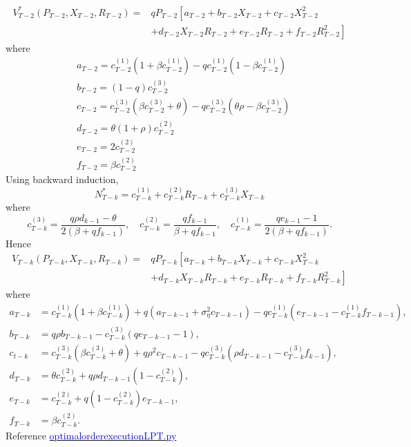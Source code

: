 \documentclass{article}
\begin{document}
$$
\begin{aligned}
V_{T-2}^{*}\left({P}_{T-2}, X_{T-2}, R_{T-2}\right)=& q {P}_{T-2}\left[a_{T-2}+b_{T-2} X_{T-2}+c_{T-2} X_{T-2}^{2}\right.\\
&\left.+d_{T-2} X_{T-2} R_{T-2}+e_{
T-2} R_{T-2}+f_{T-2} R_{T-2}^{2}\right]
\end{aligned}
$$
where
$$
\begin{aligned}
&a_{T-2}=c^{(1)}_{T-2}\left(1+\beta c^{(1)}_{T-2}\right)-q c^{(1)}_{T-2}\left(1-\beta c^{(1)}_{T-2}\right) \\
&b_{T-2}=(1-q) c^{(3)}_{T-2} \\
&c_{T-2}=c^{(3)}_{T-2}\left(\beta c^{(3)}_{T-2}+\theta\right)-q c^{(3)}_{T-2}\left(\theta \rho-\beta c^{(3)}_{T-2}\right) \\
&d_{T-2}=\theta(1+\rho) c^{(2)}_{T-2}\\
&e_{T-2}=2 c^{(2)}_{T-2} \\
&f_{T-2}=\beta c^{(2)}_{T-2}
\end{aligned}
$$
Using backward induction, 
$$
N_{T-k}^{*}=c^{(1)}_{T-k} +c^{(2)}_{T-k} R_{T-k}+c^{(3)}_{T-k} X_{T-k}
$$
where
$$
c^{(3)}_{T-k}=\frac{q \rho d_{k-1}-\theta}{2\left(\beta+q f_{k-1}\right)}, \quad c^{(2)}_{T-k}=\frac{q f_{k-1}}{\beta+q f_{k-1}}, \quad c^{(1)}_{T-k}=\frac{q e_{k-1}-1}{2\left(\beta+q f_{k-1}\right)} .
$$
Hence
$$
\begin{aligned}
V_{T-k}\left({P}_{T-k}, X_{T-k}, R_{T-k}\right)=& q {P}_{T-k}\left[a_{T-k}+b_{T-k} X_{T-k}+c_{T-k} X_{T-k}^{2}\right.\\
&\left.+d_{T-k} X_{T-k} R_{T-k}+e_{T-k} R_{T-k}+f_{T-k} R_{T-k}^{2}\right]
\end{aligned}
$$
where
$$
\begin{array}{ll}
a_{T-k} & =c^{(1)}_{T-k}\left(1+\beta c^{(1)}_{T-k}\right)+q\left(a_{T-k-1}+\sigma_{\eta}^{2} c_{T-k-1}\right)-q c^{(1)}_{T-k}\left(e_{T-k-1}-c^{(1)}_{T-k} f_{T-k-1}\right), \\
b_{T-k} & =q \rho b_{T-k-1}-c^{(3)}_{T-k}\left(q e_{T-k-1}-1\right), \\
c_{t-k} & =c^{(3)}_{T-k}\left(\beta c^{(3)}_{T-k}+\theta\right)+q \rho^{2} c_{T-k-1}-q c^{(3)}_{T-k}\left(\rho d_{T-k-1}-c^{(3)}_{T-k} f_{k-1}\right), \\
d_{T-k} & =\theta c^{(2)}_{T-k}+q \rho d_{T-k-1}\left(1-c^{(2)}_{T-k}\right), \\
e_{T-k} & =c^{(2)}_{T-k}+q\left(1-c^{(2)}_{T-k}\right) e_{T-k-1}, \\
f_{T-k} & =\beta c^{(2)}_{T-k} .
\end{array}
$$
Reference   \href{https://github.com/miaochin/RL-book/tree/master/CME241_assignments/assignment9}{\textcolor{blue}{optimal\textunderscore order\textunderscore execution\textunderscore LPT.py}}
\end{document}
